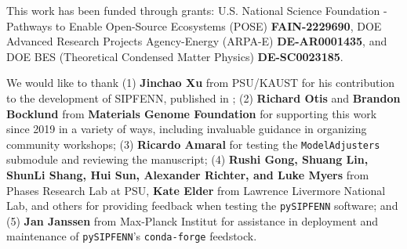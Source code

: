 This work has been funded through grants: U.S. National Science Foundation - Pathways to Enable Open-Source Ecosystems (POSE) \textbf{FAIN-2229690}, DOE Advanced Research Projects Agency-Energy (ARPA-E) \textbf{DE-AR0001435}, and DOE BES (Theoretical Condensed Matter Physics) \textbf{DE-SC0023185}.

We would like to thank (1) \textbf{Jinchao Xu} from PSU/KAUST for his contribution to the development of SIPFENN, published in \cite{Krajewski2022ExtensibleNetworks}; (2) \textbf{Richard Otis} and \textbf{Brandon Bocklund} from \textbf{Materials Genome Foundation} for supporting this work since 2019 in a variety of ways, including invaluable guidance in organizing community workshops; (3) \textbf{Ricardo Amaral} for testing the \texttt{ModelAdjusters} submodule and reviewing the manuscript; (4) \textbf{Rushi Gong, Shuang Lin, ShunLi Shang, Hui Sun, Alexander Richter, and Luke Myers} from Phases Research Lab at PSU, \textbf{Kate Elder} from Lawrence Livermore National Lab, and others for providing feedback when testing the \texttt{pySIPFENN} software; and (5) \textbf{Jan Janssen} from Max-Planck Institut for assistance in deployment and maintenance of \texttt{pySIPFENN}'s \texttt{conda-forge} feedstock.